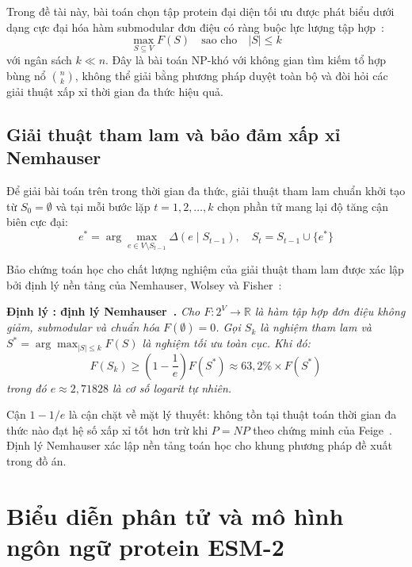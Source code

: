 Trong đề tài này, bài toán chọn tập protein đại diện tối ưu được phát biểu dưới dạng cực đại hóa hàm submodular đơn điệu có ràng buộc lực lượng tập hợp~\cite{nemhauser1978,krause2014}:
\begin{equation}
\label{eq:submodular_cardinality_problem}
\max_{S \subseteq V} F(S) \quad \text{sao cho} \quad |S| \le k
\end{equation}
với ngân sách $k \ll n$. Đây là bài toán NP-khó với không gian tìm kiếm tổ hợp bùng nổ $\binom{n}{k}$, không thể giải bằng phương pháp duyệt toàn bộ và đòi hỏi các giải thuật xấp xỉ thời gian đa thức hiệu quả.

\subsection{Giải thuật tham lam và bảo đảm xấp xỉ Nemhauser}
\label{subsec:greedy_nemhauser}

Để giải bài toán trên trong thời gian đa thức, giải thuật tham lam chuẩn khởi tạo từ $S_0 = \emptyset$ và tại mỗi bước lặp $t = 1, 2, \dots, k$ chọn phần tử mang lại độ tăng cận biên cực đại:
\begin{equation}
\label{eq:greedy_step}
e^* = \arg\max_{e \in V \setminus S_{t-1}} \Delta(e \mid S_{t-1}), \quad S_t = S_{t-1} \cup \{e^*\}
\end{equation}

Bảo chứng toán học cho chất lượng nghiệm của giải thuật tham lam được xác lập bởi định lý nền tảng của Nemhauser, Wolsey và Fisher~\cite{nemhauser1978}:

\noindent{}\textbf{Định lý \thetheorem: định lý Nemhauser~\cite{nemhauser1978}.} \textit{Cho $F: 2^V \to \mathbb{R}$ là hàm tập hợp đơn điệu không giảm, submodular và chuẩn hóa $F(\emptyset) = 0$. Gọi $S_k$ là nghiệm tham lam và $S^* = \arg\max_{|S| \le k} F(S)$ là nghiệm tối ưu toàn cục. Khi đó:
\begin{equation}
\label{eq:nemhauser_bound}
F(S_k) \ge \left(1 - \frac{1}{e}\right) F(S^*) \approx 63{,}2\% \times F(S^*)
\end{equation}
trong đó $e \approx 2{,}71828$ là cơ số logarit tự nhiên.}

Cận $1 - 1/e$ là cận chặt về mặt lý thuyết: không tồn tại thuật toán thời gian đa thức nào đạt hệ số xấp xỉ tốt hơn trừ khi $P = NP$ theo chứng minh của Feige~\cite{feige1998}. Định lý Nemhauser xác lập nền tảng toán học cho khung phương pháp đề xuất trong đồ án.

\section{Biểu diễn phân tử và mô hình ngôn ngữ protein ESM-2}
\label{sec:theory_esm2}

